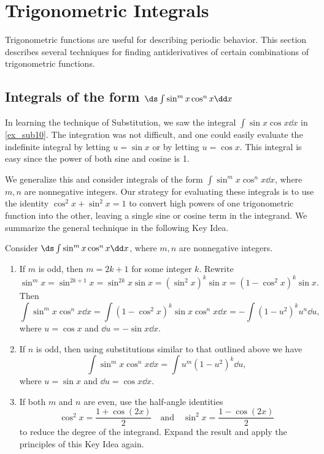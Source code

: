 

\section{Trigonometric Integrals}\label{sec:trigint}

Trigonometric functions are useful for describing periodic behavior. This section describes several techniques for finding antiderivatives of certain combinations of trigonometric functions.

\subsection{Integrals of the form \texorpdfstring{$\ds \int \sin^m x\cos^n x\dd x$}{∫(sin x)\^{}m (cos x)\^{}n dx}}

In learning the technique of Substitution, we saw the integral $\int \sin x\cos x\dd x$ in \autoref{ex_sub10}. The integration was not difficult, and one could easily evaluate the indefinite integral by letting $u=\sin x$ or by letting $u = \cos x$. This integral is easy since the power of both sine and cosine is 1.

We generalize this and consider integrals of the form $\int \sin^mx\cos^nx\dd x$, where $m,n$ are nonnegative integers. Our strategy for evaluating these integrals is to use the identity $\cos^2x+\sin^2x=1$ to convert high powers of one trigonometric function into the other, leaving a single sine or cosine term in the integrand. We summarize the general technique in the following Key Idea.



{%
\begin{keyidea}\label{idea:trig_int_1}
Consider $\ds \int \sin^mx\cos^nx\dd x$, where $m,n$ are nonnegative integers.
\begin{enumerate}
	\item	If $m$ is odd, then $m=2k+1$ for some integer $k$. Rewrite \small
		\[
		\sin^mx = \sin^{2k+1}x = \sin^{2k}x\sin x = (\sin^2x)^k\sin x = (1-\cos^2x)^k\sin x.
		\]
		\normalsize Then \small
		\[
		\int \sin^mx\cos^nx\dd x = \int (1-\cos^2x)^k\sin x\cos^nx\dd x = -\int (1-u^2)^ku^n\dd u,
		\]
		\normalsize where $u = \cos x$ and $\dd u = -\sin x\dd x$. 
	\item	If $n$ is odd, then using substitutions similar to that outlined above we have \small
		\[\int \sin^mx\cos^nx\dd x = \int u^m(1-u^2)^k\dd u,\]
		\normalsize where $u = \sin x$ and $\dd u = \cos x\dd x$.
	\item	If both $m$ and $n$ are even, use the half-angle identities \small
		\[
		\cos^2x = \frac{1+\cos (2x)}{2} \quad \text{and}\quad \sin^2x = \frac{1-\cos(2x)}2
		\]
		\normalsize to reduce the degree of the integrand. Expand the result and apply the principles of this Key Idea again.
	\end{enumerate}
\end{keyidea}%
}

